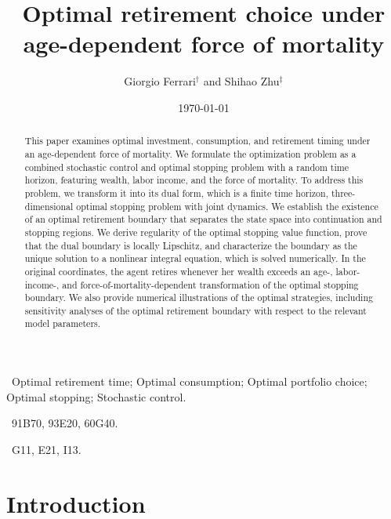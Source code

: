 \documentclass[a4paper,11pt]{amsart}
\title[Retirement under Age-Dependent Mortality]{Optimal retirement choice under age-dependent force of mortality}
\author[1]{ Giorgio Ferrari$^\dagger$ \quad and  \quad Shihao Zhu$^\ddagger$}
\date{\today}
\numberwithin{equation}{section}
\begin{document}
\newpage
\maketitle

\begin{abstract}


This paper examines {optimal investment, consumption, and retirement timing} under an age-dependent force of mortality. We formulate the optimization problem as a combined stochastic control and optimal stopping problem with a random time horizon, featuring wealth, labor income, and the force of mortality. To address this problem, we transform it into its dual form, which is a finite time horizon, three-dimensional optimal stopping problem with joint dynamics. We establish the existence of an optimal retirement boundary that separates the state space into continuation and stopping regions. {We derive regularity of the optimal stopping value function, prove that the dual boundary is locally Lipschitz, and characterize the boundary as the unique solution to a nonlinear integral equation, which is solved numerically.} In the original coordinates, the agent retires whenever her wealth exceeds an age-, labor-income-, and force-of-mortality-dependent transformation of the optimal stopping boundary. We also provide numerical illustrations of the optimal strategies, including sensitivity analyses of the optimal retirement boundary with respect to the relevant model parameters.
\end{abstract}



\vspace{2mm}

\ Optimal retirement time; Optimal consumption; Optimal portfolio choice; Optimal stopping; Stochastic control.


\vspace{2mm}

\ 91B70, 93E20, 60G40.
\vspace{2mm}

\ G11, E21, I13.
\vspace{2mm}









\section{Introduction}
\end{document}
